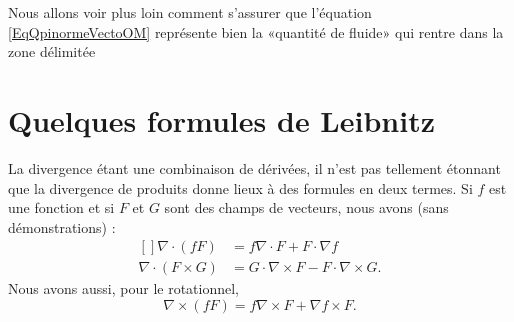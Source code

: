 \begin{remark}
    Nous allons voir plus loin comment s'assurer que l'équation \eqref{EqQpinormeVectoOM} représente bien la «quantité de fluide» qui rentre dans la zone délimitée
\end{remark}


\section{Quelques formules de Leibnitz}

La divergence étant une combinaison de dérivées, il n'est pas tellement étonnant que la divergence de produits donne lieux à des formules en deux termes. Si $f$ est une fonction et si $F$ et $G$ sont des champs de vecteurs, nous avons (sans démonstrations) :
\begin{equation}        \label{EqLeinDivNablRotOM}
    \begin{aligned}[]
        \nabla\cdot(fF)&=f\nabla\cdot F+F\cdot\nabla f\\
        \nabla\cdot(F\times G)&=G\cdot\nabla\times F-F\cdot\nabla\times G.
    \end{aligned}
\end{equation}
Nous avons aussi, pour le rotationnel,
\begin{equation}        \label{EqLeinRotfFFOM}
    \nabla\times(fF)=f\nabla\times F+\nabla f\times F.
\end{equation}
